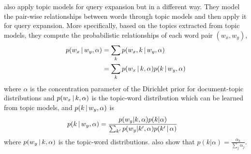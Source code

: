 \citet{Park-2009} also apply topic models for query expansion but in a
different way. They model the pair-wise relationships between words
through topic models and then apply it for query expansion. More
specifically, based on the topics extracted from topic models, they
compute the probabilistic relationships of each word pair $(w_x,
w_y)$,
\begin{align}
p(w_x \, | \, w_y, \alpha) &= \sum_k p(w_x, k  \, | \,  w_y, \alpha) \\
&= \sum_k p(w_x  \, | \,  k, \alpha) p(k  \, | \,  w_y, \alpha) \notag
\end{align}
where $\alpha$ is the concentration parameter of the Dirichlet prior
for document-topic distributions and $p(w_x  \, | \,  k, \alpha)$ is the
topic-word distribution which can be learned from topic models, and
$p(k  \, | \,  w_y, \alpha)$ is
\begin{align}
p(k  \, | \, w_y, \alpha) 
&= \frac{p(w_y|k,\alpha)p(k|\alpha)}{\sum_{k'} p(w_y|k',\alpha)p(k' \, | \, \alpha)} \notag
\end{align}
where $p(w_y \, | \, k,\alpha)$ is the topic-word distributions. \citet{Park-2009} also show that $p(k|\alpha) = \frac{\alpha_k}{\sum_j \alpha_j}$.
